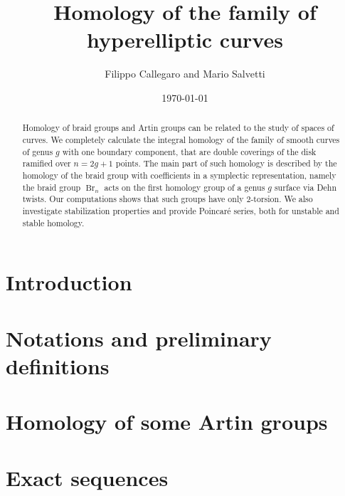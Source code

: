 \documentclass[a4paper, 12pt, pdftex,reqno
]{amsart}
\theoremstyle{definition}
\newcommand{\Br}{\operatorname{Br}}
\begin{document}
\title{%
Homology of the family of hyperelliptic curves}

\author{Filippo Callegaro and Mario Salvetti}
\date{\today 
}
\address[F. Callegaro]{
Dipartimento di Matematica, University of Pisa, Italy.
}

\address[M. Salvetti]{Dipartimento di Matematica, University of Pisa, Italy.} 



\begin{abstract}
Homology of braid groups and Artin groups can be related to the study of spaces of curves.
We completely calculate the integral homology of the family of smooth curves of genus $g$ with one boundary component, that are double coverings of the disk ramified over $n = 2g + 1$ points.
The main part of such homology is described by the homology of the braid group with coefficients in a symplectic representation, namely the braid group $\Br_n$ acts on the first homology group of a genus $g$ surface via Dehn twists. Our computations shows that such groups have only $2$-torsion. We also investigate stabilization properties and provide Poincar\'e series, both for unstable and stable homology.
\end{abstract}

\maketitle

\section{Introduction}


\setcounter{tocdepth}{1}
\tableofcontents

\section{Notations and preliminary definitions}

\section{Homology of some Artin groups}\label{sec:homol_artin}



\section{Exact sequences} \label{sec:exact_seq}
\end{document}
